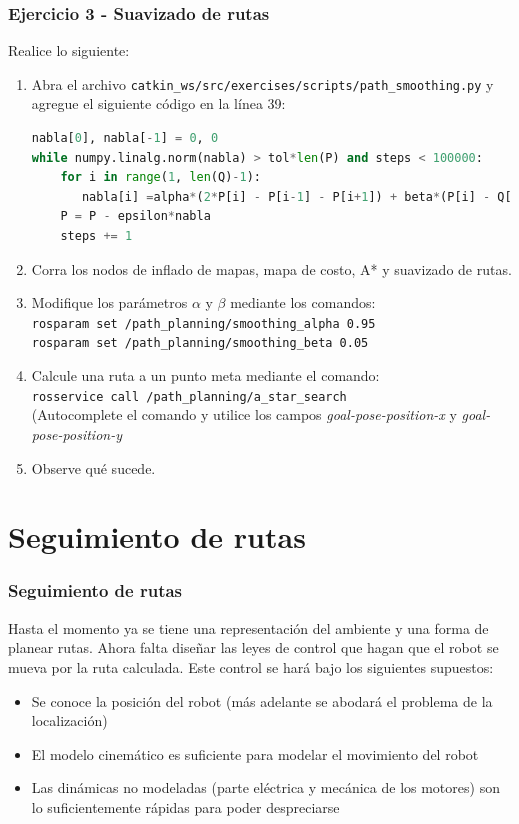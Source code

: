 \documentclass[10pt,spanish,aspectratio=1610]{beamer}
\begin{document}
\begin{frame}[containsverbatim]\frametitle{Ejercicio 3 - Suavizado de rutas}
  Realice lo siguiente:
  \begin{enumerate}
     \item Abra el archivo \texttt{catkin\_ws/src/exercises/scripts/path\_smoothing.py} y agregue el siguiente código en la línea 39:
  \begin{lstlisting}[language=Python,firstnumber=39]
nabla[0], nabla[-1] = 0, 0
while numpy.linalg.norm(nabla) > tol*len(P) and steps < 100000:
    for i in range(1, len(Q)-1):
       nabla[i] =alpha*(2*P[i] - P[i-1] - P[i+1]) + beta*(P[i] - Q[i])
    P = P - epsilon*nabla
    steps += 1
  \end{lstlisting}
  \item Corra los nodos de inflado de mapas, mapa de costo, A* y suavizado de rutas. 
  \item Modifique los parámetros $\alpha$ y $\beta$ mediante los comandos:\\
    \texttt{rosparam set /path\_planning/smoothing\_alpha 0.95}\\
    \texttt{rosparam set /path\_planning/smoothing\_beta 0.05}
  \item Calcule una ruta a un punto meta mediante el comando:\\
    \texttt{rosservice call /path\_planning/a\_star\_search}\\
    (Autocomplete el comando y utilice los campos \textit{goal-pose-position-x} y \textit{goal-pose-position-y}
  \item Observe qué sucede. 
  \end{enumerate}
\end{frame}

\section{Seguimiento de rutas}
\begin{frame}\frametitle{Seguimiento de rutas}
  Hasta el momento ya se tiene una representación del ambiente y una forma de planear rutas. Ahora falta diseñar las leyes de control que hagan que el robot se mueva por la ruta calculada. Este control se hará bajo los siguientes supuestos:
  \begin{itemize}
  \item Se conoce la posición del robot (más adelante se abodará el problema de la localización)
  \item El modelo cinemático es suficiente para modelar el movimiento del robot 
  \item Las dinámicas no modeladas (parte eléctrica y mecánica de los motores) son lo suficientemente rápidas para poder despreciarse
  \end{itemize}
\end{frame}
\end{document}
